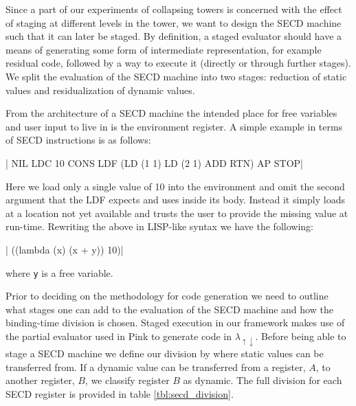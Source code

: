 \documentclass[a4paper,12pt,twoside,openright]{report}
\theoremstyle{definition}
\newcommand{\mslang}{$\lambda_{\uparrow\downarrow}$}
\begin{document}
Since a part of our experiments of collapsing towers is concerned with the effect of staging at different levels in the tower, we want to design the SECD machine such that it can later be staged. By definition, a staged evaluator should have a means of generating some form of intermediate representation, for example residual code, followed by a way to execute it (directly or through further stages). We split the evaluation of the SECD machine into two stages: reduction of static values and residualization of dynamic values.

From the architecture of a SECD machine the intended place for free variables and user input to live in is the environment register. A simple example in terms of SECD instructions is as follows:

|   NIL LDC 10 CONS LDF (LD (1 1) LD (2 1) ADD RTN) AP STOP|

Here we load only a single value of 10 into the environment and omit the second argument that the LDF expects and uses inside its body. Instead it simply loads at a location not yet available and trusts the user to provide the missing value at run-time. Rewriting the above in LISP-like syntax we have the following:

|    ((lambda (x) (x + y)) 10)|

where \texttt{y} is a free variable.

Prior to deciding on the methodology for code generation we need to outline what stages one can add to the evaluation of the SECD machine and how the binding-time division is chosen. Staged execution in our framework makes use of the partial evaluator used in Pink \cite{amin2017collapsing} to generate code in \mslang. Before being able to stage a SECD machine we define our division by where static values can be transferred from. If a dynamic value can be transferred from a register, $A$, to another register, $B$, we classify register $B$ as dynamic. The full division for each SECD register is provided in table \ref{tbl:secd_division}.
\end{document}
